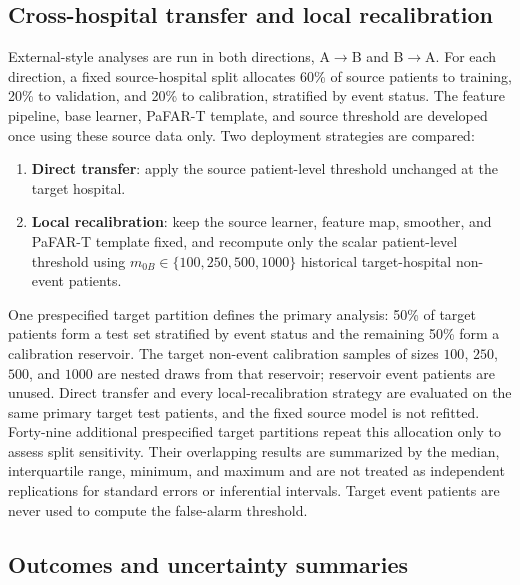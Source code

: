 \documentclass[11pt]{article}
\begin{document}
\subsection{Cross-hospital transfer and local recalibration}

External-style analyses are run in both directions, A$\rightarrow$B and B$\rightarrow$A. For each direction, a fixed source-hospital split allocates 60\% of source patients to training, 20\% to validation, and 20\% to calibration, stratified by event status. The feature pipeline, base learner, PaFAR-T template, and source threshold are developed once using these source data only. Two deployment strategies are compared:
\begin{enumerate}
    \item \textbf{Direct transfer}: apply the source patient-level threshold unchanged at the target hospital.
    \item \textbf{Local recalibration}: keep the source learner, feature map, smoother, and PaFAR-T template fixed, and recompute only the scalar patient-level threshold using $m_{0B}\in\{100,250,500,1000\}$ historical target-hospital non-event patients.
\end{enumerate}
One prespecified target partition defines the primary analysis: 50\% of target patients form a test set stratified by event status and the remaining 50\% form a calibration reservoir. The target non-event calibration samples of sizes $100$, $250$, $500$, and $1000$ are nested draws from that reservoir; reservoir event patients are unused. Direct transfer and every local-recalibration strategy are evaluated on the same primary target test patients, and the fixed source model is not refitted. Forty-nine additional prespecified target partitions repeat this allocation only to assess split sensitivity. Their overlapping results are summarized by the median, interquartile range, minimum, and maximum and are not treated as independent replications for standard errors or inferential intervals. Target event patients are never used to compute the false-alarm threshold.

\subsection{Outcomes and uncertainty summaries}
\end{document}
